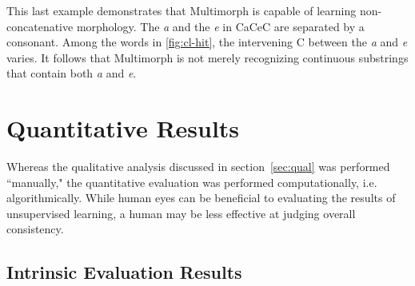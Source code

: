 This last example demonstrates that Multimorph is capable of learning non-concatenative morphology. The \textit{a} and the \textit{e} in CaCeC are separated by a consonant. Among the words in \ref{fig:cl-hit}, the intervening C between the \textit{a} and \textit{e} varies. It follows that Multimorph is not merely recognizing continuous substrings that contain both \textit{a} and \textit{e}.



\section{Quantitative Results}

	Whereas the qualitative analysis discussed in section~\ref{sec:qual} was performed ``manually," the quantitative evaluation was performed computationally, i.e. algorithmically. While human eyes can be beneficial to evaluating the results of unsupervised learning, 
	a human may be less effective at judging overall consistency. 
\subsection{Intrinsic Evaluation Results}

